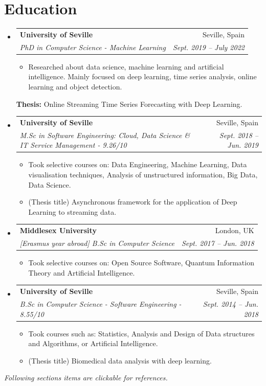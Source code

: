 \documentclass[letterpaper,11pt]{article}
\makeatletter
\newcommand{\resumeItem}[1]{%
  \item\small{
    #1
  }
}
\newcommand{\resumeSubheading}[4]{
  \vspace{0pt}\item%
    \begin{tabular*}{0.97\textwidth}[t]{l@{\extracolsep{\fill}}r}
      \textbf{#1} & #2 \\
      \textit{\small#3} & \textit{\small #4} \\
    \end{tabular*}\vspace{-5pt}
}
\newcommand{\resumeSubHeadingListStart}{\begin{itemize}[leftmargin=*]}
\newcommand{\resumeSubHeadingListEnd}{\end{itemize}}
\newcommand{\resumeItemListStart}{\begin{itemize}}
\newcommand{\resumeItemListEnd}{\end{itemize}\vspace{-5pt}}
\newcommand{\resumeTech}[2]{
 \textbf{#1:} #2
}
\makeatother
\begin{document}
\section{Education}
  \resumeSubHeadingListStart
    \resumeSubheading
      {University of Seville}{Seville, Spain}
      {PhD in Computer Science - Machine Learning }{Sept. 2019 -- July 2022}
      \resumeItemListStart
      \resumeItem{Researched about data science, machine learning and artificial intelligence. Mainly focused on deep learning, time series analysis, online learning and object detection.}
      \resumeItemListEnd
      \resumeTech{Thesis}{Online Streaming Time Series Forecasting with Deep Learning.}
    \resumeSubheading
      {University of Seville}{Seville, Spain}
      {M.Sc in Software Engineering: Cloud, Data Science \& IT Service Management - 9.26/10}{Sept. 2018 -- Jun. 2019}
      \resumeItemListStart
      \resumeItem{Took selective courses on: Data Engineering, Machine Learning, Data visualisation techniques, Analysis of unstructured information, Big Data, Data Science.}
      \resumeItem{(Thesis title) Asynchronous framework for the application of Deep Learning to streaming data.}
      \resumeItemListEnd
    \resumeSubheading
      {Middlesex University}{London, UK}
      {[Erasmus year abroad] B.Sc in Computer Science}{Sept. 2017 -- Jun. 2018}
      \resumeItemListStart
      \resumeItem{Took selective courses on: Open Source Software, Quantum Information Theory and Artificial Intelligence.}
      \resumeItemListEnd
    \resumeSubheading
      {University of Seville}{Seville, Spain}
      {B.Sc in Computer Science - Software Engineering - 8.55/10}{Sept. 2014 -- Jun. 2018}
      \resumeItemListStart
      \resumeItem{Took courses such as: Statistics, Analysis and Design of Data structures and Algorithms, or Artificial Intelligence.}
      \resumeItem{(Thesis title) Biomedical data analysis with deep learning.}
      \resumeItemListEnd
  \resumeSubHeadingListEnd

\hfill \textsl{ Following sections items are clickable for references.}
\vspace{-1.5em}
\end{document}
